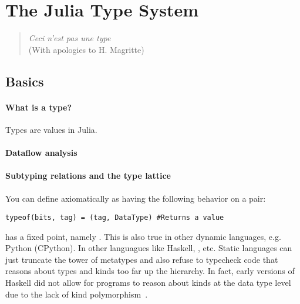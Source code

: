 \section{The Julia Type System}

\begin{quote}
  \textit{Ceci n'est pas une type} \\
  (With apologies to H. Magritte)
\end{quote}

\subsection{Basics}

\paragraph{What is a type?}
Types are values in Julia.

\paragraph{Dataflow analysis}

\paragraph{Subtyping relations and the type lattice}

\paragraph{}

You can define  axiomatically as having the following behavior on a  pair:

\begin{verbatim}
typeof(bits, tag) = (tag, DataType) #Returns a value
\end{verbatim}

 has a fixed point, namely . This is also true in other dynamic languages, e.g. Python (CPython). In other languagues like Haskell, , etc. Static languages can just truncate the tower of metatypes and also refuse to typecheck code that reasons about types and kinds too far up the hierarchy. In fact, early versions of Haskell did not allow for programs to reason about kinds at the data type level due to the lack of kind polymorphism~\cite{haskellkindtypes}.

